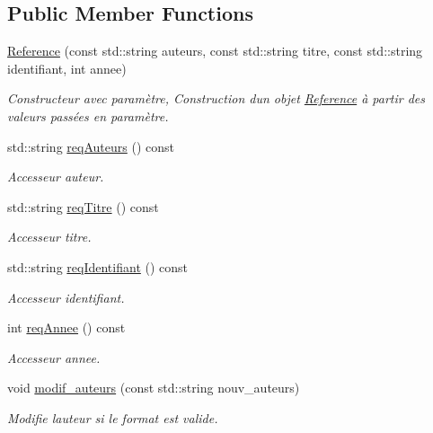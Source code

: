\subsection*{Public Member Functions}
\begin{DoxyCompactItemize}
\item 
\hyperlink{classbiblio_1_1Reference_a541f69f48b76d770c8cdf5b97197c60c}{Reference} (const std\+::string auteurs, const std\+::string titre, const std\+::string identifiant, int annee)
\begin{DoxyCompactList}\small\item\em Constructeur avec paramètre, Construction d\textquotesingle{}un objet \hyperlink{classbiblio_1_1Reference}{Reference} à partir des valeurs passées en paramètre. \end{DoxyCompactList}\item 
std\+::string \hyperlink{classbiblio_1_1Reference_a5521fc6d8894b38c314db3c300bd8a23}{req\+Auteurs} () const
\begin{DoxyCompactList}\small\item\em Accesseur auteur. \end{DoxyCompactList}\item 
std\+::string \hyperlink{classbiblio_1_1Reference_af8ad0d5a379d11a0ea8eccacf6898f93}{req\+Titre} () const
\begin{DoxyCompactList}\small\item\em Accesseur titre. \end{DoxyCompactList}\item 
std\+::string \hyperlink{classbiblio_1_1Reference_a1d47d3d615f219d41ce6dbd9c7b0651d}{req\+Identifiant} () const
\begin{DoxyCompactList}\small\item\em Accesseur identifiant. \end{DoxyCompactList}\item 
int \hyperlink{classbiblio_1_1Reference_adcf4b47dfbd090e0da711a3167aaf7ab}{req\+Annee} () const
\begin{DoxyCompactList}\small\item\em Accesseur annee. \end{DoxyCompactList}\item 
void \hyperlink{classbiblio_1_1Reference_ab7a8dcf22156371b9206095d52a6c25d}{modif\+\_\+auteurs} (const std\+::string nouv\+\_\+auteurs)
\begin{DoxyCompactList}\small\item\em Modifie l\textquotesingle{}auteur si le format est valide. \end{DoxyCompactList}\item 

\end{DoxyCompactItemize}
